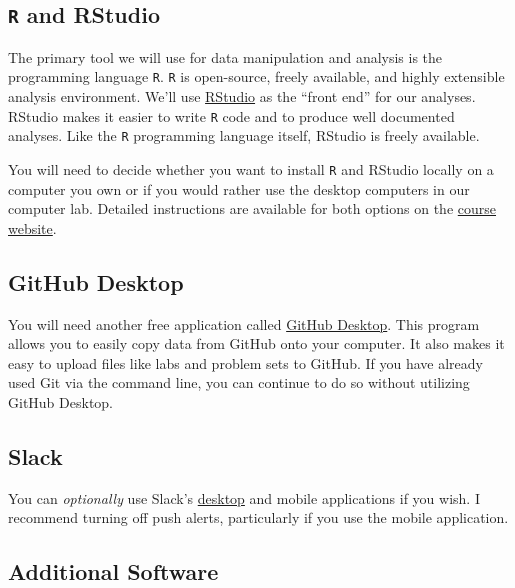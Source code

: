 \documentclass[]{book}
\begin{document}
\hypertarget{r-and-rstudio}{%
\subsection{\texorpdfstring{\texttt{R} and RStudio}{R and RStudio}}\label{r-and-rstudio}}

The primary tool we will use for data manipulation and analysis is the programming language \texttt{R}. \texttt{R} is open-source, freely available, and highly extensible analysis environment. We'll use \href{https://www.rstudio.com}{RStudio} as the ``front end'' for our analyses. RStudio makes it easier to write \texttt{R} code and to produce well documented analyses. Like the \texttt{R} programming language itself, RStudio is freely available.

You will need to decide whether you want to install \texttt{R} and RStudio locally on a computer you own or if you would rather use the desktop computers in our computer lab. Detailed instructions are available for both options on the \href{https://slu-soc5650.github.io/docs/course-software/}{course website}.

\hypertarget{github-desktop}{%
\subsection{GitHub Desktop}\label{github-desktop}}

You will need another free application called \href{https://desktop.github.com}{GitHub Desktop}. This program allows you to easily copy data from GitHub onto your computer. It also makes it easy to upload files like labs and problem sets to GitHub. If you have already used Git via the command line, you can continue to do so without utilizing GitHub Desktop.

\hypertarget{slack-1}{%
\subsection{Slack}\label{slack-1}}

You can \emph{optionally} use Slack's \href{https://slack.com/downloads}{desktop} and mobile applications if you wish. I recommend turning off push alerts, particularly if you use the mobile application.

\hypertarget{additional-software}{%
\subsection{Additional Software}\label{additional-software}}
\end{document}

